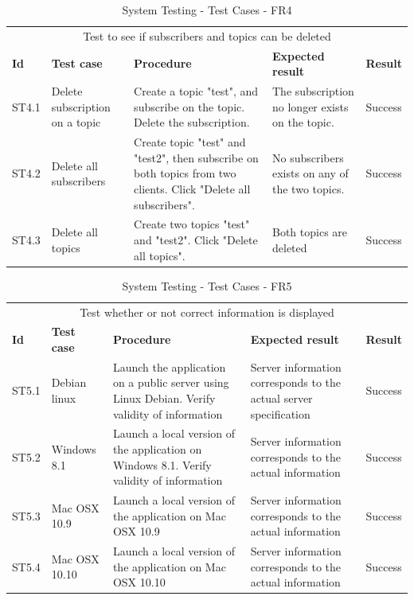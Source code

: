 \begin{table}[ht!]
\begin{tabular}{|m{1cm}|m{2cm}|m{4cm}|m{3cm}|m{1cm}|}
\hline
\rowcolor{lightgray}
\multicolumn{5}{|c|}{\textbf{FR3, Edit subscription}} \\ \hline
\multicolumn{5}{|c|}{{Test to see if subscribers and topics can be deleted}} \\ \hline
\textbf{Id} & \textbf{Test case} & \textbf{Procedure} & \textbf{Expected result} & \textbf{Result} \\ \hline
ST4.1 & Delete subscription on a topic & Create a topic "test", and subscribe on the topic. Delete the subscription. & The subscription no longer exists on the topic. & Success \\ \hline
ST4.2 & Delete all subscribers & Create topic "test" and "test2", then subscribe on both topics from two clients. Click "Delete all subscribers". & No subscribers exists on any of the two topics. & Success \\ \hline
ST4.3 & Delete all topics & Create two topics "test" and "test2". Click "Delete all topics". & Both topics are deleted & Success \\ \hline

\end{tabular}
\caption{System Testing - Test Cases - FR4}
\label{table:system-testing-cases-fr4}
\end{table}

\begin{table}[ht!]
\begin{tabular}{|m{1cm}|m{2cm}|m{4cm}|m{3cm}|m{1cm}|}
\hline
\rowcolor{lightgray}
\multicolumn{5}{|c|}{\textbf{FR5, Information}} \\ \hline
\multicolumn{5}{|c|}{{Test whether or not correct information is displayed}} \\ \hline
\textbf{Id} & \textbf{Test case} & \textbf{Procedure} & \textbf{Expected result} & \textbf{Result} \\ \hline
ST5.1 & Debian linux & Launch the application on a public server using Linux Debian. Verify validity of information & Server information corresponds to the actual server specification & Success  \\ \hline
ST5.2 & Windows 8.1 & Launch a local version of the application on Windows 8.1. Verify validity of information & Server information corresponds to the actual information & Success \\ \hline
ST5.3 & Mac OSX 10.9 & Launch a local version of the application on Mac OSX 10.9 & Server information corresponds to the actual information & Success \\ \hline
ST5.4 & Mac OSX 10.10 & Launch a local version of the application on Mac OSX 10.10 & Server information corresponds to the actual information & Success \\ \hline

\end{tabular}
\caption{System Testing - Test Cases - FR5}
\label{table:system-testing-cases-fr5}
\end{table}

